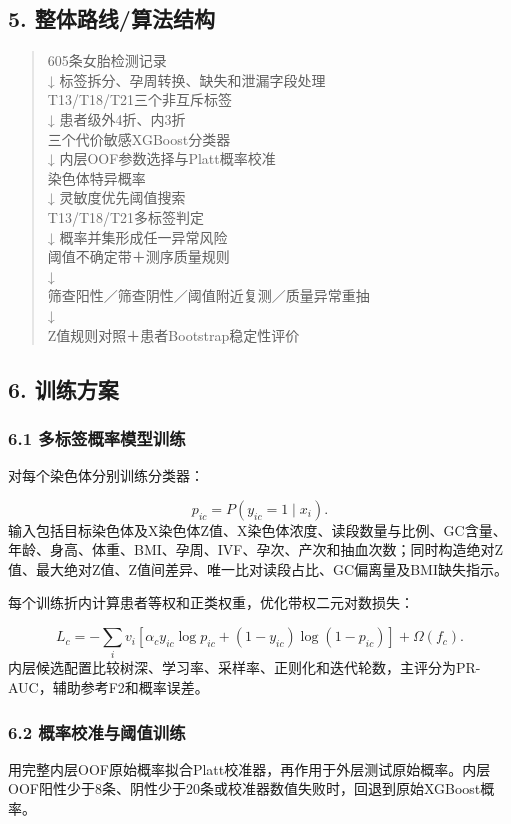 \documentclass[UTF8,12pt,a4paper]{ctexart}
\begin{document}
\subsection{5. 整体路线/算法结构}
\begin{quote}\small\sffamily
605条女胎检测记录\\
        ↓ 标签拆分、孕周转换、缺失和泄漏字段处理\\
T13/T18/T21三个非互斥标签\\
        ↓ 患者级外4折、内3折\\
三个代价敏感XGBoost分类器\\
        ↓ 内层OOF参数选择与Platt概率校准\\
染色体特异概率\\
        ↓ 灵敏度优先阈值搜索\\
T13/T18/T21多标签判定\\
        ↓ 概率并集形成任一异常风险\\
阈值不确定带＋测序质量规则\\
        ↓\\
筛查阳性／筛查阴性／阈值附近复测／质量异常重抽\\
        ↓\\
Z值规则对照＋患者Bootstrap稳定性评价\\
\end{quote}

\subsection{6. 训练方案}
\subsubsection{6.1 多标签概率模型训练}
对每个染色体\textsf{}分别训练分类器：

\[
p_{ic}=P(y_{ic}=1\mid x_i).
\]
输入包括目标染色体及X染色体Z值、X染色体浓度、读段数量与比例、GC含量、年龄、身高、体重、BMI、孕周、IVF、孕次、产次和抽血次数；同时构造绝对Z值、最大绝对Z值、Z值间差异、唯一比对读段占比、GC偏离量及BMI缺失指示。

每个训练折内计算患者等权\textsf{}和正类权重\textsf{}，优化带权二元对数损失：

\[
L_c=-\sum_i v_i[\alpha_cy_{ic}\log p_{ic}+(1-y_{ic})\log(1-p_{ic})]+\Omega(f_c).
\]
内层候选配置比较树深、学习率、采样率、正则化和迭代轮数，主评分为PR-AUC，辅助参考F2和概率误差。

\subsubsection{6.2 概率校准与阈值训练}
用完整内层OOF原始概率拟合Platt校准器，再作用于外层测试原始概率。内层OOF阳性少于8条、阴性少于20条或校准器数值失败时，回退到原始XGBoost概率。
\end{document}
